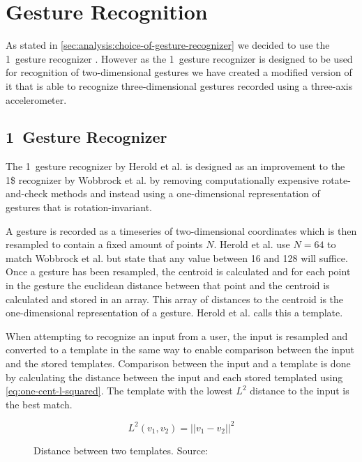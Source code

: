 \section{Gesture Recognition}
\label{sec:design:gesture-recognition}

As stated in \cref{sec:analysis:choice-of-gesture-recognizer} we decided to use the 1\textcent~gesture recognizer \cite{herold20121}.
However as the 1\textcent~gesture recognizer is designed to be used for recognition of two-dimensional gestures we have created a modified version of it that is able to recognize three-dimensional gestures recorded using a three-axis accelerometer.

\subsection{1\textcent~Gesture Recognizer}
The 1\textcent~gesture recognizer by Herold et al. is designed as an improvement to the 1\$ recognizer \cite{wobbrock2007gestures} by Wobbrock et al. by removing computationally expensive rotate-and-check methods and instead using a one-dimensional representation of gestures that is rotation-invariant.

A gesture is recorded as a timeseries of two-dimensional coordinates which is then resampled to contain a fixed amount of points $N$.
Herold et al. use $N = 64$ to match Wobbrock et al. but state that any value between 16 and 128 will suffice.
Once a gesture has been resampled, the centroid is calculated and for each point in the gesture the euclidean distance between that point and the centroid is calculated and stored in an array.
This array of distances to the centroid is the one-dimensional representation of a gesture. Herold et al. calls this a template.

When attempting to recognize an input from a user, the input is resampled and converted to a template in the same way to enable comparison between the input and the stored templates.
Comparison between the input and a template is done by calculating the distance between the input and each stored templated using \cref{eq:one-cent-l-squared}.
The template with the lowest $L^2$ distance to the input is the best match.

\begin{figure}
\begin{equation}
L^{2}(v_1, v_2) = \lvert\lvert v_1 - v_2 \rvert\rvert^2
\label{eq:one-cent-l-squared}
\end{equation}
\caption{Distance between two templates. Source: \cite{herold20121}}
\end{figure}

